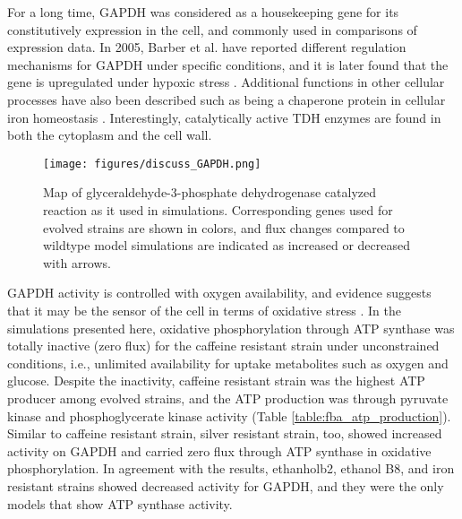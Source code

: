 For a long time, GAPDH was considered as a housekeeping gene for its constitutively expression in the cell, and commonly used in comparisons of expression data. In 2005, Barber et al. have reported different regulation mechanisms for GAPDH under specific conditions\cite{barber2005gapdh}, and it is later found that the gene is upregulated under hypoxic stress \cite{yang2008effects}. Additional functions in other cellular processes have also been described such as being a chaperone protein in cellular iron homeostasis \cite{sweeny2018glyceraldehyde}. Interestingly, catalytically active TDH enzymes are found in both the cytoplasm and the cell wall.

\begin{figure}[H]
\texttt{[image: figures/discuss\_GAPDH.png]}
\caption[Map of glyceraldehyde-3-phosphate dehydrogenase catalyzed reaction as it used in simulations]{Map of glyceraldehyde-3-phosphate dehydrogenase catalyzed reaction as it used in simulations. Corresponding genes used for evolved strains are shown in colors, and flux changes compared to wildtype model simulations are indicated as increased or decreased with arrows.}
\label{fig:discuss_GAPDH}
\end{figure}

GAPDH activity is controlled with oxygen availability, and evidence suggests that it may be the sensor of the cell in terms of oxidative stress \cite{chuang2005glyceraldehyde}. In the simulations presented here, oxidative phosphorylation through ATP synthase was totally inactive (zero flux) for the caffeine resistant strain under unconstrained conditions, i.e., unlimited availability for uptake metabolites such as oxygen and glucose. Despite the inactivity, caffeine resistant strain was the highest ATP producer among evolved strains, and the ATP production was through pyruvate kinase and phosphoglycerate kinase activity (Table \ref{table:fba_atp_production}). Similar to caffeine resistant strain, silver resistant strain, too, showed increased activity on GAPDH and carried zero flux through ATP synthase in oxidative phosphorylation. In agreement with the results, ethanholb2, ethanol B8, and iron resistant strains showed decreased activity for GAPDH, and they were the only models that show ATP synthase activity.

